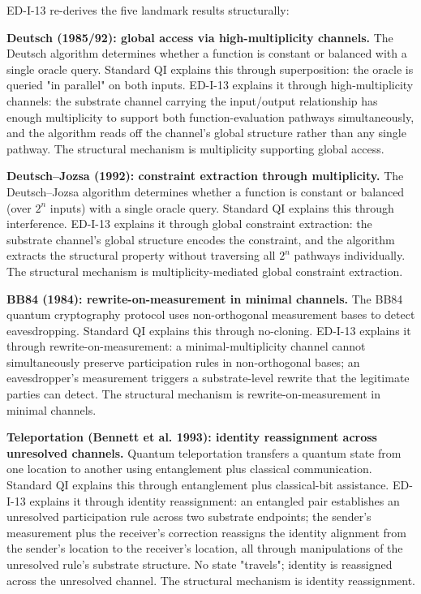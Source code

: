 \documentclass[11pt]{book}
\begin{document}
ED-I-13 re-derives the five landmark results structurally:

\textbf{Deutsch (1985/92): global access via high-multiplicity channels.} The Deutsch algorithm determines whether a function is constant or balanced with a single oracle query. Standard QI explains this through superposition: the oracle is queried "in parallel" on both inputs. ED-I-13 explains it through high-multiplicity channels: the substrate channel carrying the input/output relationship has enough multiplicity to support both function-evaluation pathways simultaneously, and the algorithm reads off the channel's global structure rather than any single pathway. The structural mechanism is multiplicity supporting global access.

\textbf{Deutsch–Jozsa (1992): constraint extraction through multiplicity.} The Deutsch–Jozsa algorithm determines whether a function is constant or balanced (over $2^n$ inputs) with a single oracle query. Standard QI explains this through interference. ED-I-13 explains it through global constraint extraction: the substrate channel's global structure encodes the constraint, and the algorithm extracts the structural property without traversing all $2^n$ pathways individually. The structural mechanism is multiplicity-mediated global constraint extraction.

\textbf{BB84 (1984): rewrite-on-measurement in minimal channels.} The BB84 quantum cryptography protocol uses non-orthogonal measurement bases to detect eavesdropping. Standard QI explains this through no-cloning. ED-I-13 explains it through rewrite-on-measurement: a minimal-multiplicity channel cannot simultaneously preserve participation rules in non-orthogonal bases; an eavesdropper's measurement triggers a substrate-level rewrite that the legitimate parties can detect. The structural mechanism is rewrite-on-measurement in minimal channels.

\textbf{Teleportation (Bennett et al. 1993): identity reassignment across unresolved channels.} Quantum teleportation transfers a quantum state from one location to another using entanglement plus classical communication. Standard QI explains this through entanglement plus classical-bit assistance. ED-I-13 explains it through identity reassignment: an entangled pair establishes an unresolved participation rule across two substrate endpoints; the sender's measurement plus the receiver's correction reassigns the identity alignment from the sender's location to the receiver's location, all through manipulations of the unresolved rule's substrate structure. No state "travels"; identity is reassigned across the unresolved channel. The structural mechanism is identity reassignment.
\end{document}
